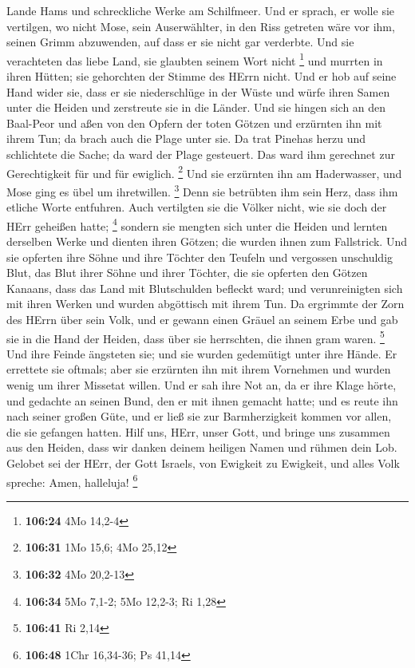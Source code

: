 Lande Hams und schreckliche Werke am Schilfmeer.  Und er
sprach, er wolle sie vertilgen, wo nicht Mose, sein Auserwählter, in den
Riss getreten wäre vor ihm, seinen Grimm abzuwenden, auf dass er sie
nicht gar verderbte.  Und sie verachteten das liebe Land,
sie glaubten seinem Wort nicht \footnote{\textbf{106:24} 4Mo 14,2-4}
 und murrten in ihren Hütten; sie gehorchten der Stimme des
HErrn nicht.  Und er hob auf seine Hand wider sie, dass er
sie niederschlüge in der Wüste  und würfe ihren Samen unter
die Heiden und zerstreute sie in die Länder.  Und sie
hingen sich an den Baal-Peor und aßen von den Opfern der toten Götzen
 und erzürnten ihn mit ihrem Tun; da brach auch die Plage
unter sie.  Da trat Pinehas herzu und schlichtete die
Sache; da ward der Plage gesteuert.  Das ward ihm gerechnet
zur Gerechtigkeit für und für ewiglich. \footnote{\textbf{106:31} 1Mo
  15,6; 4Mo 25,12}  Und sie erzürnten ihn am Haderwasser,
und Mose ging es übel um ihretwillen. \footnote{\textbf{106:32} 4Mo
  20,2-13}  Denn sie betrübten ihm sein Herz, dass ihm
etliche Worte entfuhren.  Auch vertilgten sie die Völker
nicht, wie sie doch der HErr geheißen hatte; \footnote{\textbf{106:34}
  5Mo 7,1-2; 5Mo 12,2-3; Ri 1,28}  sondern sie mengten sich
unter die Heiden und lernten derselben Werke  und dienten
ihren Götzen; die wurden ihnen zum Fallstrick.  Und sie
opferten ihre Söhne und ihre Töchter den Teufeln  und
vergossen unschuldig Blut, das Blut ihrer Söhne und ihrer Töchter, die
sie opferten den Götzen Kanaans, dass das Land mit Blutschulden befleckt
ward;  und verunreinigten sich mit ihren Werken und wurden
abgöttisch mit ihrem Tun.  Da ergrimmte der Zorn des HErrn
über sein Volk, und er gewann einen Gräuel an seinem Erbe 
und gab sie in die Hand der Heiden, dass über sie herrschten, die ihnen
gram waren. \footnote{\textbf{106:41} Ri 2,14}  Und ihre
Feinde ängsteten sie; und sie wurden gedemütigt unter ihre Hände.
 Er errettete sie oftmals; aber sie erzürnten ihn mit ihrem
Vornehmen und wurden wenig um ihrer Missetat willen.  Und
er sah ihre Not an, da er ihre Klage hörte,  und gedachte
an seinen Bund, den er mit ihnen gemacht hatte; und es reute ihn nach
seiner großen Güte,  und er ließ sie zur Barmherzigkeit
kommen vor allen, die sie gefangen hatten.  Hilf uns, HErr,
unser Gott, und bringe uns zusammen aus den Heiden, dass wir danken
deinem heiligen Namen und rühmen dein Lob.  Gelobet sei der
HErr, der Gott Israels, von Ewigkeit zu Ewigkeit, und alles Volk
spreche: Amen, halleluja! \footnote{\textbf{106:48} 1Chr 16,34-36; Ps
  41,14}

